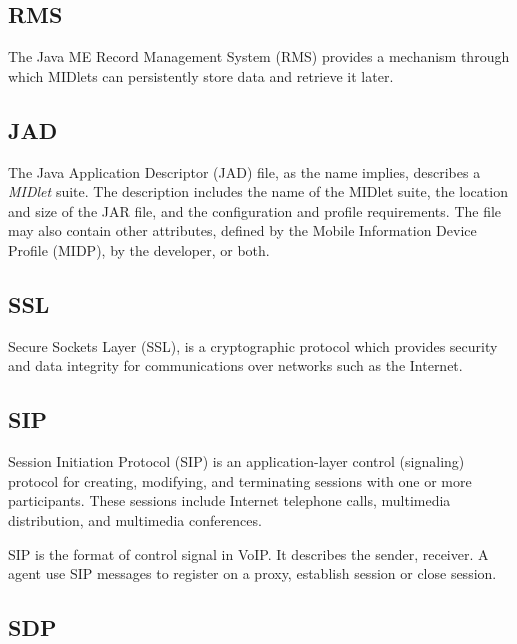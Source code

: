 \subsection*{RMS}
\label{sec:RMS}
\label{sym:RMS}
The Java ME Record Management System (RMS) provides a mechanism through which MIDlets can persistently store data and retrieve it later.\cite{J2MERecordManagementStore}

\subsection*{JAD}
\label{sec:JAD}
\label{sym:JAD}

The Java Application Descriptor (JAD) file, as the name implies, describes a \textit{MIDlet} suite. The description includes the name of the MIDlet suite, the location and size of the JAR file, and the configuration and profile requirements. The file may also contain other attributes, defined by the Mobile Information Device Profile (MIDP), by the developer, or both.\cite{LearningPathMIDletLifeCycle}


\subsection*{SSL}
\label{sec:SSL}
\label{sym:SSL}

Secure Sockets Layer (SSL), is a cryptographic protocol which provides security and data integrity for communications over networks such as the Internet.\cite{SSLAtWiKi}


\subsection*{SIP}
\label{sec:SIP}
\label{sym:SIP}

Session Initiation Protocol (SIP) is an application-layer control (signaling) protocol for creating, modifying, and terminating sessions with one or more participants. These sessions include Internet telephone calls, multimedia distribution, and multimedia conferences.\cite{RFC3261}

SIP is the format of control signal in VoIP. It describes the sender, receiver. A agent use SIP messages to register on a proxy, establish session or close session. 

\subsection*{SDP}
\label{sec:SDP}
\label{sym:SDP}

